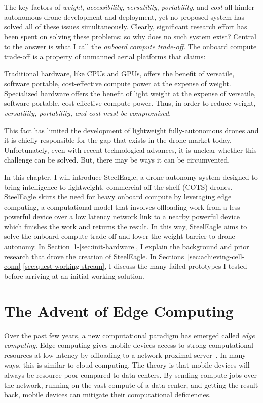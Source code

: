 The key factors of \textit{weight}, \textit{accessibility}, \textit{versatility}, \textit{portability}, and \textit{cost} all hinder autonomous drone development and deployment, yet no proposed system has solved all of these issues simultaneously. Clearly, significant research effort has been spent on solving these problems; so why does no such system exist? Central to the answer is what I call the \textit{onboard compute trade-off}. The onboard compute trade-off is a property of unmanned aerial platforms that claims:

\begin{displayquote}
Traditional hardware, like CPUs and GPUs, offers the benefit of versatile, software portable, cost-effective compute power at the expense of weight. Specialized hardware offers the benefit of light weight at the expense of versatile, software portable, cost-effective compute power. Thus, in order to reduce weight, \textit{versatility, portability, and cost must be compromised}.
\end{displayquote}

This fact has limited the development of lightweight fully-autonomous drones and it is chiefly responsible for the gap that exists in the drone market today. Unfortunately, even with recent technological advances, it is unclear whether this challenge can be solved. But, there may be ways it can be circumvented. 

In this chapter, I will introduce SteelEagle, a drone autonomy system designed to bring intelligence to lightweight, commercial-off-the-shelf (COTS) drones. SteelEagle skirts the need for heavy onboard compute by leveraging edge computing, a computational model that involves offloading work from a less powerful device over a low latency network link to a nearby powerful device which finishes the work and returns the result. In this way, SteelEagle aims to solve the onboard compute trade-off and lower the weight-barrier to drone autonomy. In Section~\ref{sec:advent-edge}-\ref{sec:init-hardware}, I explain the background and prior research that drove the creation of SteelEagle. In Sections~\ref{sec:achieving-cell-conn}-\ref{sec:quest-working-stream}, I discuss the many failed prototypes I tested before arriving at an initial working solution.

\section{The Advent of Edge Computing}
\label{sec:advent-edge}
Over the past few years, a new computational paradigm has emerged called \textit{edge computing}. Edge computing gives mobile devices access to strong computational resources at low latency by offloading to a network-proximal server~\cite{Satya2017}. In many ways, this is similar to cloud computing. The theory is that mobile devices will always be resource-poor compared to data centers. By sending compute jobs over the network, running on the vast compute of a data center, and getting the result back, mobile devices can mitigate their computational deficiencies. 

